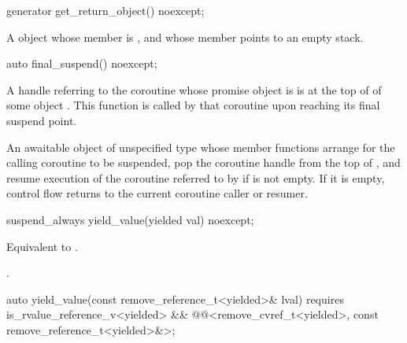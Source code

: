%
\begin{itemdecl}
generator get_return_object() noexcept;
\end{itemdecl}

\begin{itemdescr}
\pnum
\returns
A  object whose member 
is ,
and whose member  points to an empty stack.
\end{itemdescr}

%
\begin{itemdecl}
auto final_suspend() noexcept;
\end{itemdecl}

\begin{itemdescr}
\pnum
\expects
A handle referring to the coroutine
whose promise object is 
is at the top of 
of some  object .
This function is called by that coroutine
upon reaching its final suspend point.

\pnum
\returns
An awaitable object of unspecified type
whose member functions arrange for the
calling coroutine to be suspended,
pop the coroutine handle
from the top of ,
and resume execution of the coroutine referred to by
if  is not empty.
If it is empty, control flow returns to the
current coroutine caller or resumer.
\end{itemdescr}

%
\begin{itemdecl}
suspend_always yield_value(yielded val) noexcept;
\end{itemdecl}

\begin{itemdescr}
\pnum
\effects
Equivalent to .

\pnum
\returns
\tcode{\{\}}.
\end{itemdescr}

%
\begin{itemdecl}
auto yield_value(const remove_reference_t<yielded>& lval)
  requires is_rvalue_reference_v<yielded> &&
    @@<remove_cvref_t<yielded>, const remove_reference_t<yielded>&>;
\end{itemdecl}

